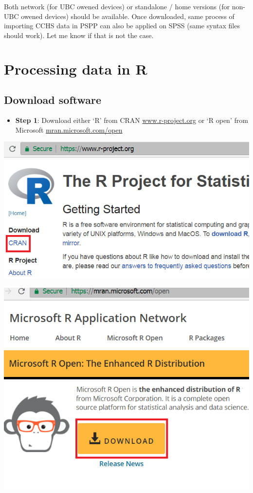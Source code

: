 \documentclass[
]{book}
\providecommand{\tightlist}{%
  \setlength{\itemsep}{0pt}\setlength{\parskip}{0pt}}
\begin{document}
Both network (for UBC owened devices) or standalone / home versions (for non-UBC owened devices) should be available. Once downloaded, same process of importing CCHS data in PSPP can also be applied on SPSS (same syntax files should work). Let me know if that is not the case.

\hypertarget{processing-data-in-r}{%
\section{Processing data in R}\label{processing-data-in-r}}

\hypertarget{download-software}{%
\subsection{Download software}\label{download-software}}

\begin{itemize}
\tightlist
\item
  \textbf{Step 1}: Download either `R' from CRAN \href{https://www.r-project.org/}{www.r-project.org} or `R open' from Microsoft \href{https://mran.microsoft.com/open}{mran.microsoft.com/open}
\end{itemize}

\includegraphics[width=0.65\linewidth]{images/R03}

\includegraphics[width=0.65\linewidth]{images/R01}
\end{document}
